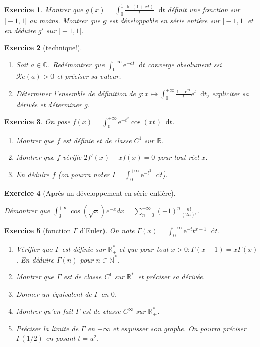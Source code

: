\documentclass[12pt,a4paper]{article}
\newcommand{\R}{\mathbb{R}}
\newcommand{\C}{\mathbb{C}}
\newcommand{\N}{\mathbb{N}}
\renewcommand{\Re}{\mathcal{R}e}
\newcommand{\E}{\mathrm{e}}
\newcommand{\diff}{\mathop{}\mathopen{}\mathrm{d}}%
{%
\theoremstyle{break}
\theoremprework{%
\rule{0.5\linewidth}{0.3pt}}
\theorempostwork{\hfill%
\rule{0.5\linewidth}{0.3pt}}
\theoremheaderfont{\scshape}
\theoremseparator{ ---}
\newtheorem{Prop}{%
\textcolor{blue}{Proposition}}[section]
}
\theoremstyle{break}
\newtheorem{Exo}{Exercice}
\begin{document}
\begin{Exo}

	Montrer que $g(x)=\int_0^1\frac{\ln(1+xt)}{t}\diff t$ définit une fonction sur $]-1,1[$ au moins. Montrer que $g$ est développable en série entière sur $]-1,1[$ et en déduire $g'$ sur $]-1,1[$.

\end{Exo}
\newpage


\begin{Exo}[technique!]\ 
	\begin{enumerate}
		\item
		Soit $a\in\C$. Redémontrer que $\int_0^{+\infty}\E^{-at}\diff t$ converge absolument ssi $\Re(a)>0$ et préciser sa valeur.
		\item
		Déterminer l'ensemble de définition de  $g:x\mapsto \int_0^{+\infty}\frac{1-\E^{xt}}{t}\E^t \diff t$, expliciter sa dérivée et déterminer $g$.
	\end{enumerate}	
\end{Exo}



\begin{Exo}
	On pose $f(x)=\int_0^{+\infty}\E^{-t^2}\cos(xt)\diff t$.
	\begin{enumerate}
		\item
		Montrer que $f$ est définie et de classe $C^1$ sur $\R$.
		\item
		Montrer que $f$ vérifie $2f'(x)+xf(x)=0$ pour tout réel $x$.
		\item
		En déduire $f$ (on pourra noter $I=\int_0^{+\infty}\E^{-t^2}\diff t$).
	\end{enumerate}
\end{Exo}



\begin{Exo}[Après un développement en série entière]\ 
	
	Démontrer que $\int_0^{+\infty}\cos(\sqrt x)e^{-x}dx=\sum_{n=0}^{+\infty}(-1)^n \frac{n!}{(2n)!}$.
\end{Exo}

\begin{Exo}[fonction $\Gamma$ d'Euler]
	On note $\Gamma(x)=\int_0^{+\infty}\E^{-t}t^{x-1}\diff t$.
	\begin{enumerate}
		\item
		Vérifier que $\Gamma$ est définie sur $\R_+^*$ et que pour tout $x>0:\Gamma(x+1)=x\Gamma(x)$. En déduire $\Gamma(n)$ pour $n\in \N^*$.
		\item
		Montrer que $\Gamma$ est de classe $C^1$ sur $\R_+^*$ et préciser sa dérivée.
		\item Donner un équivalent de $\Gamma$ en $0$.
		\item Montrer qu'en fait $\Gamma$ est  de classe $C^{\infty}$ sur $\R_+^*$.
		\item Préciser la limite de $\Gamma$ en $+\infty$ et esquisser son graphe. On pourra préciser $\Gamma(1/2)$ en posant $t=u^2$.
	\end{enumerate}
\end{Exo}
\end{document}
